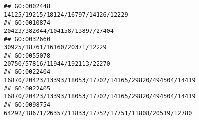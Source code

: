 \documentclass[
]{article}
\begin{document}
\begin{verbatim}
## GO:0002448                                                                                                                                                                                                                                                                                                                                                                          14125/19215/18124/16797/14126/12229
## GO:0010874                                                                                                                                                                                                                                                                                                                                                                              20423/382044/104158/13897/27404
## GO:0032660                                                                                                                                                                                                                                                                                                                                                                                30925/18761/16160/20371/12229
## GO:0055078                                                                                                                                                                                                                                                                                                                                                                               20750/57816/11944/192113/22270
## GO:0022404                                                                                                                                                                                                                                                                                                                                                       16870/20423/13393/18053/17702/14165/29820/494504/14419
## GO:0022405                                                                                                                                                                                                                                                                                                                                                       16870/20423/13393/18053/17702/14165/29820/494504/14419
## GO:0098754                                                                                                                                                                                                                                                                                                                                                        64292/18671/26357/11833/17752/17751/11808/20519/12780

\end{verbatim}
\end{document}
